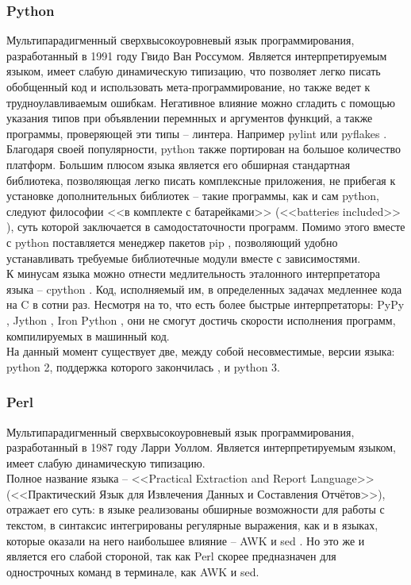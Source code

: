 \subsubsection{Python}\label{sec:ch2/sec1/sub1/sub2}
Мультипарадигменный сверхвысокоуровневый язык программирования,
разработанный в 1991 году Гвидо Ван Россумом.
Является интерпретируемым языком, имеет слабую динамическую типизацию,
что позволяет легко писать обобщенный код и использовать мета-программирование,
но также ведет к трудноулавливаемым ошибкам. Негативное влияние можно сгладить
с помощью указания типов при объявлении перемнных и аргументов функций, а также 
программы, проверяющей эти типы -- линтера. Например pylint \autocite{pylint} или
pyflakes \autocite{pyflakes}.\\
Благодаря своей популярности, python также портирован на большое количество платформ.
Большим плюсом языка является его обширная стандартная библиотека, позволяющая легко
писать комплексные приложения, не прибегая к установке дополнительных библиотек --
такие программы, как и сам python, следуют философии <<в комплекте с батарейками>>
(<<batteries included>> \autocite{batteries-included}), суть которой заключается в 
самодостаточности программ. Помимо этого вместе с python поставляется менеджер
пакетов pip \autocite{pip}, позволяющий удобно устанавливать требуемые библиотечные модули вместе
с зависимостями.\\
К минусам языка можно отнести медлительность эталонного интерпретатора языка -- cpython \autocite{cpython}.
Код, исполняемый им, в определенных задачах медленнее кода на C в сотни раз. Несмотря на то, что
есть более быстрые интерпретаторы: PyPy \autocite{pypy}, Jython \autocite{jython}, Iron Python \autocite{iron-python},
они не смогут достичь скорости исполнения программ, компилируемых в машинный код.\\
На данный момент существует две, между собой несовместимые, версии языка: 
python 2, поддержка которого закончилась , и python 3.

\subsubsection{Perl}\label{sec:ch2/sec1/sub1/sub2}
Мультипарадигменный сверхвысокоуровневый 
язык программирования, разработанный в 1987 году Ларри Уоллом.
Является интерпретируемым языком, имеет слабую динамическую типизацию.\\
Полное название языка -- <<Practical Extraction and Report Language>> 
(<<Практический Язык для Извлечения Данных и Составления Отчётов>>), отражает его суть:
в языке реализованы обширные возможности для работы с текстом, в синтаксис интегрированы 
регулярные выражения, как и в языках, которые оказали на него наибольшее влияние --
AWK \autocite{awk} и sed \autocite{sed}. Но это же и является его слабой стороной, так как
Perl скорее предназначен для однострочных команд в терминале, как AWK и
sed.
        
